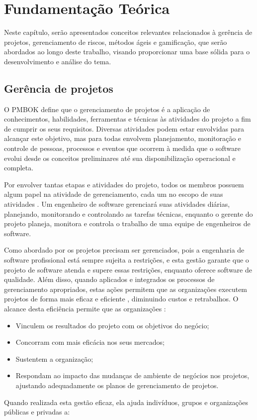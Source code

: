 \documentclass[
	12pt,
	openright,
	twoside,
	a4paper,
	english,
	brazil
	]{abntex2}
\begin{document}

\chapter{Fundamentação Teórica} %

Neste capítulo, serão apresentados conceitos relevantes relacionados à gerência de projetos, gerenciamento de riscos, métodos ágeis e gamificação, que serão abordados ao longo deste trabalho, visando proporcionar uma base sólida para o desenvolvimento e análise do tema.

\section{Gerência de projetos}

O PMBOK \citeyear{PMBOK} define que o gerenciamento de projetos é a aplicação de conhecimentos, habilidades, ferramentas e técnicas às atividades do projeto a fim de cumprir os seus requisitos. Diversas atividades podem estar envolvidas para alcançar este objetivo, mas para  todas envolvem planejamento, monitoração e controle de pessoas, processos e eventos que ocorrem à medida que o software evolui desde os conceitos preliminares até sua disponibilização operacional e completa.

Por envolver tantas etapas e atividades do projeto, todos os membros possuem algum papel na atividade de gerenciamento, cada um no escopo de suas atividades \cite{Pressman_2014}. Um engenheiro de software gerenciará suas atividades diárias, planejando, monitorando e controlando as tarefas técnicas, enquanto o gerente do projeto planeja, monitora e controla o trabalho de uma equipe de engenheiros de software.

Como abordado por  os projetos precisam ser gerenciados, pois a engenharia de software profissional está sempre sujeita a restrições, e esta gestão garante que o projeto de software atenda e supere essas restrições, enquanto oferece software de qualidade. Além disso, quando aplicados e integrados os processos de gerenciamento apropriados, estas ações permitem que as organizações executem projetos de forma mais eficaz e eficiente \cite{PMBOK}, diminuindo custos e retrabalhos. O alcance desta eficiência permite que as organizações \cite{PMBOK}:

\begin{itemize}
  \item Vinculem os resultados do projeto com os objetivos do negócio;
  \item Concorram com mais eficácia nos seus mercados;
  \item Sustentem a organização;
  \item Respondam ao impacto das mudanças de ambiente de negócios nos projetos, ajustando adequadamente os planos de gerenciamento de projetos.
\end{itemize}
Quando realizada esta gestão eficaz, ela ajuda indivíduos, grupos e organizações públicas e privadas a:
\end{document}

